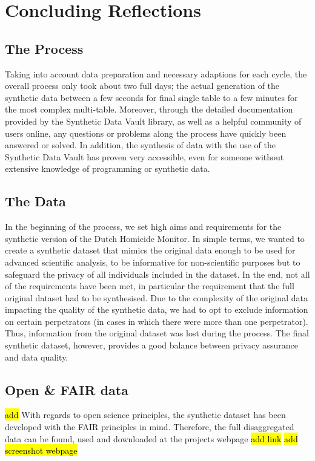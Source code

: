 
\section{Concluding Reflections}

\subsection{The Process}
Taking into account data preparation and necessary adaptions for each cycle, the overall process only took about two full days; the actual generation of the synthetic data between a few seconds for final single table to a few minutes for the most complex multi-table. Moreover, through the detailed documentation provided by the Synthetic Data Vault library, as well as a helpful community of users online, any questions or problems along the process have quickly been answered or solved. In addition, the synthesis of data with the use of the Synthetic Data Vault has proven very accessible, even for someone without extensive knowledge of programming or synthetic data. 

\subsection{The Data}
In the beginning of the process, we set high aims and requirements for the synthetic version of the Dutch Homicide Monitor. In simple terms, we wanted to create a synthetic dataset that mimics the original data enough to be used for advanced scientific analysis, to be informative for non-scientific purposes but to safeguard the privacy of all individuals included in the dataset. In the end, not all of the requirements have been met, in particular the requirement that the full original dataset had to be synthesised. Due to the complexity of the original data impacting the quality of the synthetic data, we had to opt to exclude information on certain perpetrators (in cases in which there were more than one perpetrator). Thus, information from the original dataset was lost during the process. The final synthetic dataset, however, provides a good balance between privacy assurance and data quality. 

\subsection{Open \& FAIR data}
\hl{add}
With regards to open science principles, the synthetic dataset has been developed with the FAIR principles in mind. Therefore, the full disaggregated data can be found, used and downloaded at the projects webpage \hl{add link}
\hl{add screenshot webpage}




